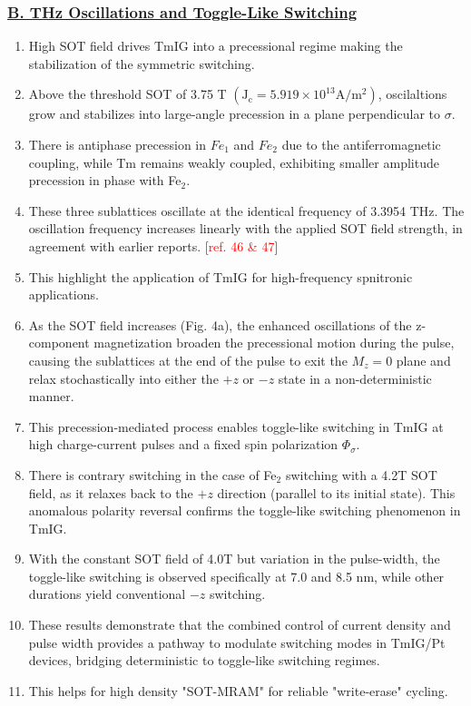 \subsubsection*{\underline{B. THz Oscillations and Toggle-Like Switching}}
\begin{enumerate}
    \item High SOT field drives TmIG into a precessional regime making the stabilization of the symmetric switching.
    \item Above the threshold SOT of 3.75 T $(\mathrm{J_c=5.919\times10^{13} A/m^2})$, oscilaltions grow and stabilizes into large-angle precession in a plane perpendicular to $\sigma$.
    \item There is antiphase precession in $Fe_1$ and $Fe_2$ due to the antiferromagnetic coupling, while Tm remains weakly coupled, exhibiting smaller amplitude precession in phase with Fe$_2$.
    \item These three sublattices oscillate at the identical frequency of 3.3954 THz. The oscillation frequency increases linearly with the applied SOT field strength, in agreement with earlier reports. [\textcolor{red}{ref. 46 \& 47}]
    \item This highlight the application of TmIG for high-frequency spnitronic applications.
    \item As the SOT field increases (Fig. 4a), the enhanced oscillations of the z-component magnetization broaden the precessional motion during the pulse, causing the sublattices at the end of the pulse to exit the $M_z=0$ plane and relax stochastically into either the $+z$ or $-z$ state in a non-deterministic manner.
    \item This precession-mediated process enables toggle-like switching in TmIG at high charge-current pulses and a fixed spin polarization $\Phi_\sigma$.
    \item There is contrary switching in the case of Fe$_2$ switching with a 4.2T SOT field, as it relaxes back to the $+z$ direction (parallel to its initial state). This anomalous polarity reversal confirms the toggle-like switching phenomenon in TmIG.
    \item With the constant SOT field of 4.0T but variation in the pulse-width, the toggle-like switching is observed specifically at 7.0 and 8.5 nm, while other durations yield conventional $-z$ switching.
    \item These results demonstrate that the combined control of current density and pulse width provides a pathway to modulate switching modes in TmIG/Pt devices, bridging deterministic to toggle-like switching regimes.
    \item This helps for high density "SOT-MRAM" for reliable "write-erase" cycling.
\end{enumerate}

